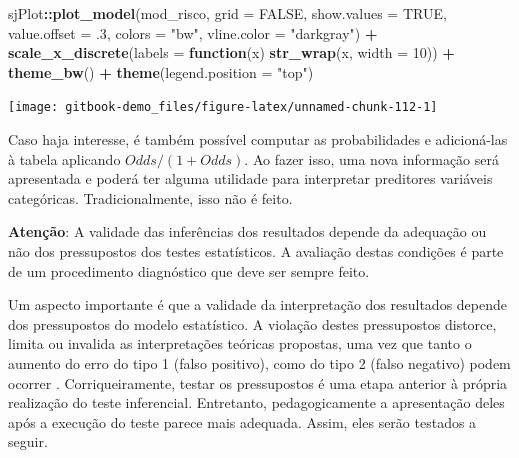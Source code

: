 \documentclass[
]{book}
\newenvironment{Shaded}{\begin{snugshade}}{\end{snugshade}}
\newcommand{\ControlFlowTok}[1]{\textcolor[rgb]{0.13,0.29,0.53}{\textbf{#1}}}
\newcommand{\DataTypeTok}[1]{\textcolor[rgb]{0.13,0.29,0.53}{#1}}
\newcommand{\DecValTok}[1]{\textcolor[rgb]{0.00,0.00,0.81}{#1}}
\newcommand{\FloatTok}[1]{\textcolor[rgb]{0.00,0.00,0.81}{#1}}
\newcommand{\KeywordTok}[1]{\textcolor[rgb]{0.13,0.29,0.53}{\textbf{#1}}}
\newcommand{\NormalTok}[1]{#1}
\newcommand{\OperatorTok}[1]{\textcolor[rgb]{0.81,0.36,0.00}{\textbf{#1}}}
\newcommand{\OtherTok}[1]{\textcolor[rgb]{0.56,0.35,0.01}{#1}}
\newcommand{\StringTok}[1]{\textcolor[rgb]{0.31,0.60,0.02}{#1}}
\newenvironment{warning}{
  \definecolor{shadecolor}{rgb}{0, 0, 0}  %
  \color{white}
  \begin{shaded}}
 {\end{shaded}}
\begin{document}
\begin{Shaded}
\begin{Highlighting}[]
\NormalTok{sjPlot}\OperatorTok{::}\KeywordTok{plot_model}\NormalTok{(mod_risco,}
            \DataTypeTok{grid =} \OtherTok{FALSE}\NormalTok{, }
            \DataTypeTok{show.values =} \OtherTok{TRUE}\NormalTok{, }\DataTypeTok{value.offset =} \FloatTok{.3}\NormalTok{, }
            \DataTypeTok{colors =} \StringTok{"bw"}\NormalTok{,}
            \DataTypeTok{vline.color =} \StringTok{"darkgray"}\NormalTok{) }\OperatorTok{+}
\StringTok{  }\KeywordTok{scale_x_discrete}\NormalTok{(}\DataTypeTok{labels =} \ControlFlowTok{function}\NormalTok{(x) }\KeywordTok{str_wrap}\NormalTok{(x, }\DataTypeTok{width =} \DecValTok{10}\NormalTok{)) }\OperatorTok{+}
\StringTok{  }\KeywordTok{theme_bw}\NormalTok{() }\OperatorTok{+}
\StringTok{  }\KeywordTok{theme}\NormalTok{(}\DataTypeTok{legend.position =} \StringTok{"top"}\NormalTok{)}
\end{Highlighting}
\end{Shaded}

\begin{center}\texttt{[image: gitbook-demo\_files/figure-latex/unnamed-chunk-112-1]} \end{center}

Caso haja interesse, é também possível computar as probabilidades e adicioná-las à tabela aplicando \(Odds/(1+Odds)\). Ao fazer isso, uma nova informação será apresentada e poderá ter alguma utilidade para interpretar preditores variáveis categóricas. Tradicionalmente, isso não é feito.

\begin{warning}

\textbf{Atenção}: A validade das inferências dos resultados depende da adequação ou não dos pressupostos dos testes estatísticos. A avaliação destas condições é parte de um procedimento diagnóstico que deve ser sempre feito.

\end{warning}

Um aspecto importante é que a validade da interpretação dos resultados depende dos pressupostos do modelo estatístico. A violação destes pressupostos distorce, limita ou invalida as interpretações teóricas propostas, uma vez que tanto o aumento do erro do tipo 1 (falso positivo), como do tipo 2 (falso negativo) podem ocorrer \citep{Lix1996, Barker2015, Ernst2017}. Corriqueiramente, testar os pressupostos é uma etapa anterior à própria realização do teste inferencial. Entretanto, pedagogicamente a apresentação deles após a execução do teste parece mais adequada. Assim, eles serão testados a seguir.
\end{document}
